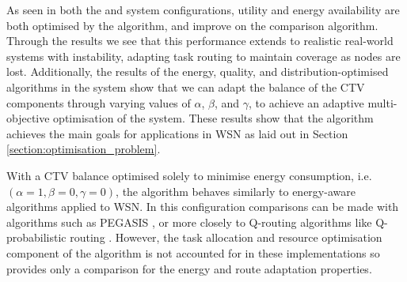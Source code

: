 As seen in both the \simulationSimple{}{}  and \simulationNodeFailure{}{} system configurations, utility and energy availability are both optimised by the algorithm, and improve on the comparison \acronymQRouting{}{} algorithm. Through the \simulationNodeFailure{}{} results we see that this performance extends to realistic real-world systems with instability, adapting task routing to maintain coverage as nodes are lost.  Additionally, the results of the \acronymWSNOptimisation{}{} energy, quality, and distribution-optimised algorithms in the \simulationExtended{}{} system show that we can adapt the balance of the CTV components through varying values of $\alpha$, $\beta$, and $\gamma$, to achieve an adaptive multi-objective optimisation of the system. These results show that the algorithm achieves the main goals for applications in WSN as laid out in Section \ref{section:optimisation_problem}.

With a CTV balance optimised solely to minimise energy consumption, i.e. $(\alpha=1,\beta=0,\gamma=0)$, the \acronymWSNOptimisation{}{} algorithm behaves similarly to energy-aware algorithms applied to WSN. In this configuration comparisons can be made with algorithms such as PEGASIS \citep{Lindsey2002}, or more closely to Q-routing algorithms like Q-probabilistic routing \citep{Arroyo-Valles2007}. However, the task allocation and resource optimisation component of the \acronymWSNOptimisation{}{} algorithm is not accounted for in these implementations so provides only a comparison for the energy and route adaptation properties. 
